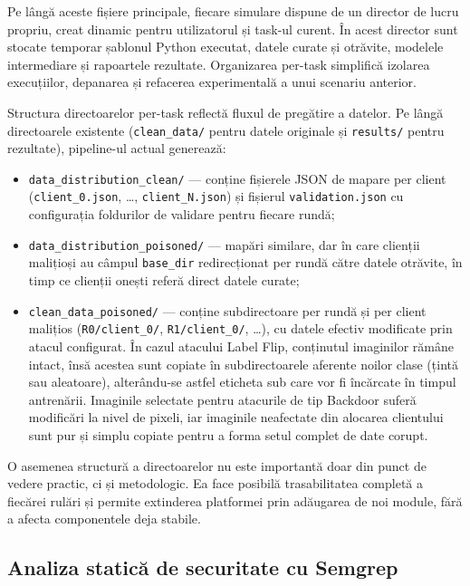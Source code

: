 \documentclass[../../main.tex]{subfiles}
\begin{document}
    Pe lângă aceste fișiere principale, fiecare simulare dispune de un director de lucru propriu, creat dinamic pentru utilizatorul și task-ul curent. În acest director sunt stocate temporar șablonul Python executat, datele curate și otrăvite, modelele intermediare și rapoartele rezultate. Organizarea per-task simplifică izolarea execuțiilor, depanarea și refacerea experimentală a unui scenariu anterior.

    Structura directoarelor per-task reflectă fluxul de pregătire a datelor. Pe lângă directoarele existente (\texttt{clean\_data/} pentru datele originale și \texttt{results/} pentru rezultate), pipeline-ul actual generează:
    \begin{itemize}
        \item \texttt{data\_distribution\_clean/} --- conține fișierele JSON de mapare per client (\texttt{client\-\_0.json}, \dots, \texttt{client\_N.json}) și fișierul \texttt{validation.json} cu configurația foldurilor de validare pentru fiecare rundă;
        \item \texttt{data\_distribution\_poisoned/} --- mapări similare, dar în care clienții malițioși au câmpul \texttt{base\_dir} redirecționat per rundă către datele otrăvite, în timp ce clienții onești referă direct datele curate;
        \item \texttt{clean\_data\_poisoned/} --- conține subdirectoare per rundă și per client malițios (\texttt{R0/\-client\_0/}, \texttt{R1/client\_0/}, \dots), cu datele efectiv modificate prin atacul configurat. În cazul atacului Label Flip, conținutul imaginilor rămâne intact, însă acestea sunt copiate în subdirectoarele aferente noilor clase (țintă sau aleatoare), alterându-se astfel eticheta sub care vor fi încărcate în timpul antrenării. Imaginile selectate pentru atacurile de tip Backdoor suferă modificări la nivel de pixeli, iar imaginile neafectate din alocarea clientului sunt pur și simplu copiate pentru a forma setul complet de date corupt.
    \end{itemize}


    O asemenea structură a directoarelor nu este importantă doar din punct de vedere practic, ci și metodologic. Ea face posibilă trasabilitatea completă a fiecărei rulări și permite extinderea platformei prin adăugarea de noi module, fără a afecta componentele deja stabile.

    \subsection{Analiza statică de securitate cu Semgrep}
\end{document}

